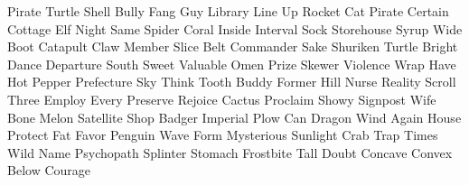 \documentclass[letterpaper,frontgrid]{flacards}
\begin{document}
        {Pirate}
        {Turtle Shell}
        {Bully}
        {Fang}
        {Guy}
        {Library}
        {Line Up}
        {Rocket}
        {Cat Pirate}
        {Certain}
        {Cottage}
        {Elf}
        {Night}
        {Same}
        {Spider}
        {Coral}
        {Inside}
        {Interval}
        {Sock}
        {Storehouse}
        {Syrup}
        {Wide}
        {Boot}
        {Catapult}
        {Claw}
        {Member}
        {Slice}
        {Belt}
        {Commander}
        {Sake}
        {Shuriken}
        {Turtle}
        {Bright}
        {Dance}
        {Departure}
        {South}
        {Sweet}
        {Valuable}
        {Omen}
        {Prize}
        {Skewer}
        {Violence}
        {Wrap}
        {Have}
        {Hot Pepper}
        {Prefecture}
        {Sky}
        {Think}
        {Tooth}
        {Buddy}
        {Former}
        {Hill}
        {Nurse}
        {Reality}
        {Scroll}
        {Three}
        {Employ}
        {Every}
        {Preserve}
        {Rejoice}
        {Cactus}
        {Proclaim}
        {Showy}
        {Signpost}
        {Wife}
        {Bone}
        {Melon}
        {Satellite}
        {Shop}
        {Badger}
        {Imperial}
        {Plow}
        {Can}
        {Dragon}
        {Wind}
        {Again}
        {House}
        {Protect}
        {Fat}
        {Favor}
        {Penguin}
        {Wave}
        {Form}
        {Mysterious}
        {Sunlight}
        {Crab Trap}
        {Times}
        {Wild}
        {Name}
        {Psychopath}
        {Splinter}
        {Stomach}
        {Frostbite}
        {Tall}
        {Doubt}
        {Concave}
        {Convex}
        {Below}
	{Courage}
\end{document}

